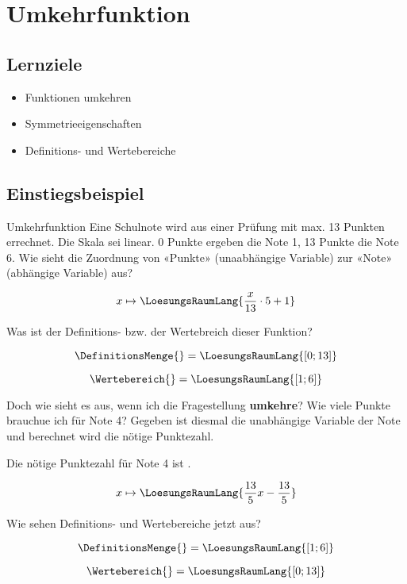 \section{Umkehrfunktion}

\subsection{Lernziele}

\begin{itemize}
\item Funktionen umkehren
\item Symmetrieeigenschaften
\item Definitions- und Wertebereiche
\end{itemize} 
\newpage

\subsection{Einstiegsbeispiel}
\begin{beispiel}{Umkehrfunktion}{}
  Eine Schulnote wird aus einer Prüfung mit max. 13 Punkten errechnet.
  Die Skala sei linear. 0 Punkte ergeben die Note 1, 13 Punkte die
  Note 6. Wie sieht die Zuordnung von «Punkte» (unaabhängige Variable)
  zur «Note» (abhängige Variable) aus?

  \leserluft
  
  $$x \mapsto  \LoesungsRaumLang{\frac{x}{13}\cdot{} 5 + 1}$$

  Was ist der Definitions- bzw. der Wertebreich dieser Funktion?

  \leserluft
  
  $$\DefinitionsMenge{} = \LoesungsRaumLang{[0; 13]}$$

  \leserluft
  
  $$\Wertebereich{} = \LoesungsRaumLang{[1; 6]}$$

  Doch wie sieht es aus, wenn ich die Fragestellung \textbf{umkehre}?
  Wie viele Punkte brauchue ich für Note 4? Gegeben ist diesmal die
  unabhängige Variable der Note und berechnet wird die nötige
  Punktezahl.

  \leserluft{}
  
  Die nötige Punktezahl für Note 4 ist .

  \leserluft{}
  
  $$x \mapsto \LoesungsRaumLang{\frac{13}5 x - \frac{13}5}$$

    Wie sehen Definitions- und Wertebereiche jetzt aus?

    $$\DefinitionsMenge{} = \LoesungsRaumLang{ [1; 6] }$$


    $$\Wertebereich{} = \LoesungsRaumLang{ [0;13] }$$
  
\end{beispiel}
\newpage

